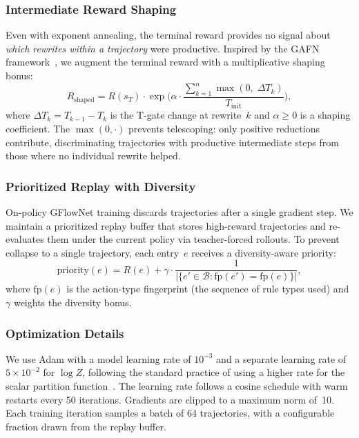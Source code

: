 \documentclass[11pt,a4paper]{article}
\newcommand{\cB}{\mathcal{B}}
\begin{document}
\subsubsection{Intermediate Reward Shaping}\label{sec:shaping}

Even with exponent annealing, the terminal reward provides no signal
about \emph{which rewrites within a trajectory} were productive.
Inspired by the GAFN framework~\cite{pan2023gafn}, we augment the
terminal reward with a multiplicative shaping bonus:
\begin{equation}\label{eq:shaping}
R_{\mathrm{shaped}} = R(s_T) \cdot
\exp\!\Biggl(\alpha \cdot
\frac{\sum_{k=1}^{n} \max(0,\;\Delta T_k)}{T_{\mathrm{init}}}
\Biggr),
\end{equation}
where $\Delta T_k = T_{k-1} - T_k$ is the T-gate change at rewrite~$k$
and $\alpha \ge 0$ is a shaping coefficient.  The $\max(0, \cdot)$
prevents telescoping: only positive reductions contribute, discriminating
trajectories with productive intermediate steps from those where no
individual rewrite helped.

\subsubsection{Prioritized Replay with Diversity}\label{sec:replay}

On-policy GFlowNet training discards trajectories after a single gradient
step.  We maintain a prioritized replay buffer that stores high-reward
trajectories and re-evaluates them under the current policy via
teacher-forced rollouts.  To prevent collapse to a single trajectory,
each entry~$e$ receives a diversity-aware priority:
\begin{equation}\label{eq:priority}
\mathrm{priority}(e) = R(e) + \gamma \cdot
\frac{1}{|\{e' \in \cB : \mathrm{fp}(e') = \mathrm{fp}(e)\}|},
\end{equation}
where $\mathrm{fp}(e)$ is the action-type fingerprint (the sequence of
rule types used) and $\gamma$ weights the diversity bonus.

\subsubsection{Optimization Details}\label{sec:optim}

We use Adam with a model learning rate of $10^{-3}$ and a separate
learning rate of $5 \times 10^{-2}$ for $\log Z$, following the standard
practice of using a higher rate for the scalar partition
function~\cite{malkin2022trajectory}.  The learning rate follows a cosine
schedule with warm restarts every 50 iterations.  Gradients are clipped
to a maximum norm of~10.  Each training iteration samples a batch of 64
trajectories, with a configurable fraction drawn from the replay buffer.
\end{document}
